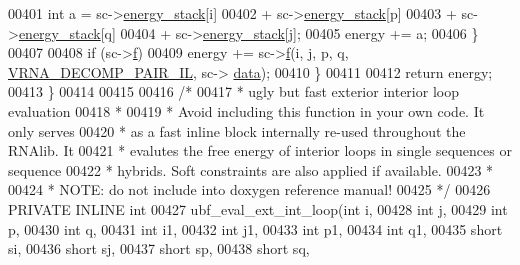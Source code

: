 \begin{DoxyCode}
00401         \textcolor{keywordtype}{int} a = sc->\hyperlink{group__soft__constraints_ac20dded6068e81acd0f1139092f66a22}{energy\_stack}[i]
00402                 + sc->\hyperlink{group__soft__constraints_ac20dded6068e81acd0f1139092f66a22}{energy\_stack}[p]
00403                 + sc->\hyperlink{group__soft__constraints_ac20dded6068e81acd0f1139092f66a22}{energy\_stack}[q]
00404                 + sc->\hyperlink{group__soft__constraints_ac20dded6068e81acd0f1139092f66a22}{energy\_stack}[j];
00405         energy += a;
00406       \}
00407 
00408     \textcolor{keywordflow}{if} (sc->\hyperlink{group__soft__constraints_a32dc86090237888c75491bbd4861a04b}{f})
00409       energy += sc->\hyperlink{group__soft__constraints_a32dc86090237888c75491bbd4861a04b}{f}(i, j, p, q, \hyperlink{group__constraints_gaeab04f34d7730cff2d651d782f95d857}{VRNA\_DECOMP\_PAIR\_IL}, sc->
      \hyperlink{group__soft__constraints_a7574680143df97b9029146c2150bf06d}{data});
00410   \}
00411 
00412   \textcolor{keywordflow}{return} energy;
00413 \}
00414 
00415 
00416 \textcolor{comment}{/*}
00417 \textcolor{comment}{ *  ugly but fast exterior interior loop evaluation}
00418 \textcolor{comment}{ *}
00419 \textcolor{comment}{ *  Avoid including this function in your own code. It only serves}
00420 \textcolor{comment}{ *  as a fast inline block internally re-used throughout the RNAlib. It}
00421 \textcolor{comment}{ *  evalutes the free energy of interior loops in single sequences or sequence}
00422 \textcolor{comment}{ *  hybrids. Soft constraints are also applied if available.}
00423 \textcolor{comment}{ *}
00424 \textcolor{comment}{ *  NOTE: do not include into doxygen reference manual!}
00425 \textcolor{comment}{ */}
00426 PRIVATE INLINE \textcolor{keywordtype}{int}
00427 ubf\_eval\_ext\_int\_loop(\textcolor{keywordtype}{int}           i,
00428                       \textcolor{keywordtype}{int}           j,
00429                       \textcolor{keywordtype}{int}           p,
00430                       \textcolor{keywordtype}{int}           q,
00431                       \textcolor{keywordtype}{int}           i1,
00432                       \textcolor{keywordtype}{int}           j1,
00433                       \textcolor{keywordtype}{int}           p1,
00434                       \textcolor{keywordtype}{int}           q1,
00435                       \textcolor{keywordtype}{short}         si,
00436                       \textcolor{keywordtype}{short}         sj,
00437                       \textcolor{keywordtype}{short}         sp,
00438                       \textcolor{keywordtype}{short}         sq,

\end{DoxyCode}
